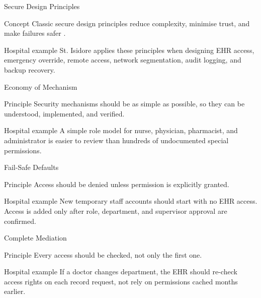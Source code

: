 \documentclass[presentation]{beamer}
\begin{document}
\begin{frame}[c]{Secure Design Principles}
\begin{block}{Concept}
Classic secure design principles reduce complexity, minimise trust, and make failures safer
\cite{saltzer_schroeder_1975}.
\end{block}

\begin{exampleblock}{Hospital example}
St. Isidore applies these principles when designing EHR access, emergency override, remote access,
network segmentation, audit logging, and backup recovery.
\end{exampleblock}
\end{frame}

\begin{frame}[c]{Economy of Mechanism}
\begin{block}{Principle}
Security mechanisms should be as simple as possible, so they can be understood, implemented, and
verified.
\end{block}

\begin{exampleblock}{Hospital example}
A simple role model for nurse, physician, pharmacist, and administrator is easier to review than
hundreds of undocumented special permissions.
\end{exampleblock}
\end{frame}

\begin{frame}[c]{Fail-Safe Defaults}
\begin{block}{Principle}
Access should be denied unless permission is explicitly granted.
\end{block}

\begin{exampleblock}{Hospital example}
New temporary staff accounts should start with no EHR access. Access is added only after role,
department, and supervisor approval are confirmed.
\end{exampleblock}
\end{frame}

\begin{frame}[c]{Complete Mediation}
\begin{block}{Principle}
Every access should be checked, not only the first one.
\end{block}

\begin{exampleblock}{Hospital example}
If a doctor changes department, the EHR should re-check access rights on each record request,
not rely on permissions cached months earlier.
\end{exampleblock}
\end{frame}
\end{document}
